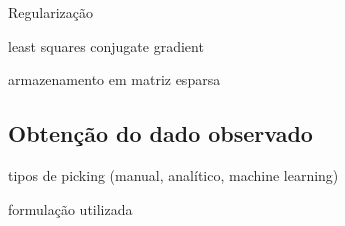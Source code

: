 Regularização 


\cite{sain2023active}



least squares conjugate gradient

armazenamento em matriz esparsa

\cite{saad2003iterative}






\subsection*{Obtenção do dado observado}



tipos de picking (manual, analítico, machine learning)

formulação utilizada

\cite{pan2019automatic} 
\cite{qin2021first} 
